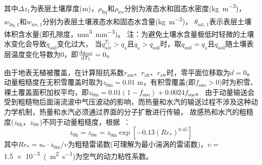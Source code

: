 其中$\Delta z_{1}$为表层土壤厚度(m)，$\rho_{\mathrm{liq}}$和$\rho_{\mathrm{ice}}$分别为液态水和固态水密度(\unit{kg.m^{-3}})，
$w_{\mathrm{liq,1}}$和$w_{\mathrm{ice,1}}$分别为表层土壤液态水和固态水含量(\unit{kg.m^{-2}})，
$\theta_{\mathrm{sat,1}}$表示表层土壤体积含水量(即孔隙度，\unit{mm^3.mm^{-3}})。
注：为避免土壤水含量极低时轻微的土壤水变化会导致$q_{\mathrm{soil}}$变化过大，
当$q_{\mathrm{sat}}^{T_1}>q_{\mathrm{a}}$且$q_{\mathrm{a}}>q_{\mathrm{soil}}$时，取$q_{\mathrm{soil}} = q_{\mathrm{a}}$且$q_{\mathrm{soil}}$随土壤表层温度变化导数为0，即$\frac{{\rm d}q_{\mathrm{soil}}}{{\rm d}T_1} = 0$。


由于地表无植被覆盖，在计算阻抗系数$r_{\mathrm{am}}$、$r_{\mathrm{ah}}$、$r_{\mathrm{aw}}$时，零平面位移取为$d=0$。动量粗糙度在无积雪覆盖时取为$z_{\mathrm{0m}}=0.01$ m，有积雪覆盖(即$f_{\mathrm{sno}}>0$)时为积雪、裸土覆盖面积加权平均，即$z_{\mathrm{0m}}=0.01\left( 1-f_{\mathrm{sno}} \right )+ 0.0024 f_{\mathrm{sno}}$。
由于动量输送会受到粗糙物后面湍流波中气压波动的影响，而热量和水汽的输送过程不涉及这种动力学机制，热量和水汽必须通过界面的分子扩散进行传输，
故感热和水汽的粗糙度($z_{\mathrm{0h}}$，$z_{\mathrm{0w}}$)不同于动量粗糙度，根据~\citet{zeng1998effect}：
\begin{equation}\label{z0hw}
  z_{\mathrm{0 h}} = z_{\mathrm{0 w}} = z_{\mathrm{0 m}} \exp \left[-0.13\left(Re_{*}\right)^{0.45}\right]
\end{equation}
其中$Re_{*} = u_{*} \cdot z_{\mathrm{0 m}} / \upsilon$为粗糙雷诺数(可理解为最小湍涡的雷诺数)，$\upsilon=$ \qty{1.5e-5}{(m^2.s^{-1}})为空气的动力粘性系数。


